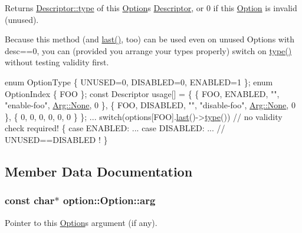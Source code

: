 Returns \hyperlink{structoption_1_1Descriptor_a1b220dabd8aad075fa441a80f9b9343c}{Descriptor\+::type} of this \hyperlink{classoption_1_1Option}{Option}\textquotesingle{}s \hyperlink{structoption_1_1Descriptor}{Descriptor}, or 0 if this \hyperlink{classoption_1_1Option}{Option} is invalid (unused). 

Because this method (and \hyperlink{classoption_1_1Option_afe2aff68191e55b59c53fac3dbbcd7c3}{last()}, too) can be used even on unused Options with desc==0, you can (provided you arrange your types properly) switch on \hyperlink{classoption_1_1Option_a6560fa0526e2affd87d5a10622336af4}{type()} without testing validity first. 
\begin{DoxyCode}
\textcolor{keyword}{enum} OptionType \{ UNUSED=0, DISABLED=0, ENABLED=1 \};
\textcolor{keyword}{enum} OptionIndex \{ FOO \};
\textcolor{keyword}{const} Descriptor usage[] = \{
  \{ FOO, ENABLED,  \textcolor{stringliteral}{""}, \textcolor{stringliteral}{"enable-foo"},  \hyperlink{structoption_1_1Arg_a7fc01987899c91c6b6a1be5711a46e22}{Arg::None}, 0 \},
  \{ FOO, DISABLED, \textcolor{stringliteral}{""}, \textcolor{stringliteral}{"disable-foo"}, \hyperlink{structoption_1_1Arg_a7fc01987899c91c6b6a1be5711a46e22}{Arg::None}, 0 \},
  \{ 0, 0, 0, 0, 0, 0 \} \};
...
switch(options[FOO].\hyperlink{classoption_1_1Option_afe2aff68191e55b59c53fac3dbbcd7c3}{last}()->\hyperlink{classoption_1_1Option_a6560fa0526e2affd87d5a10622336af4}{type}()) \textcolor{comment}{// no validity check required!}
\{
  \textcolor{keywordflow}{case} ENABLED: ...
  \textcolor{keywordflow}{case} DISABLED: ...  \textcolor{comment}{// UNUSED==DISABLED !}
\}
\end{DoxyCode}
 

\subsection{Member Data Documentation}
\subsubsection[{\texorpdfstring{arg}{arg}}]{\setlength{\rightskip}{0pt plus 5cm}const char$\ast$ option\+::\+Option\+::arg}\hypertarget{classoption_1_1Option_a402be734987458364b0f473acae36238}{}\label{classoption_1_1Option_a402be734987458364b0f473acae36238}


Pointer to this \hyperlink{classoption_1_1Option}{Option}\textquotesingle{}s argument (if any). 

